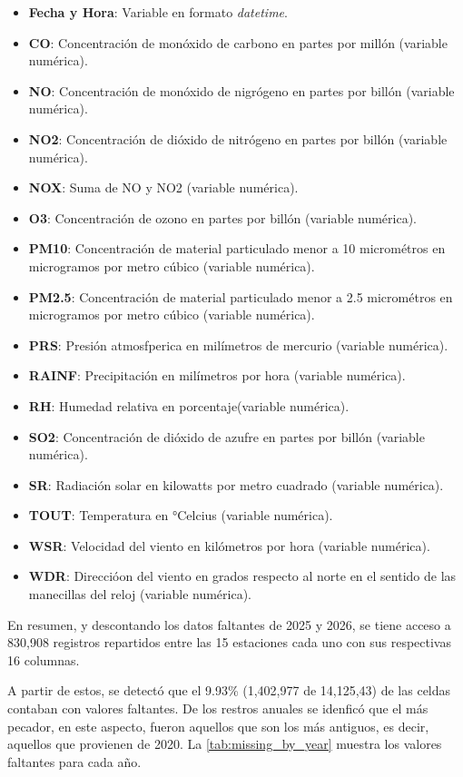 \documentclass[11pt]{article}
\begin{document}
\begin{itemize}
    \item \textbf{Fecha y Hora}: Variable en formato \textit{datetime}.
    \item \textbf{CO}: Concentración de monóxido de carbono en partes por millón (variable numérica).
    \item \textbf{NO}: Concentración de monóxido de nigrógeno en partes por billón (variable numérica).
    \item \textbf{NO2}: Concentración de dióxido de nitrógeno en partes por billón (variable numérica).
    \item \textbf{NOX}: Suma de NO y NO2 (variable numérica).
    \item \textbf{O3}: Concentración de ozono en partes por billón (variable numérica).
    \item \textbf{PM10}: Concentración de material particulado menor a 10 micrométros en microgramos por metro cúbico (variable numérica).
    \item \textbf{PM2.5}: Concentración de material particulado menor a 2.5 micrométros en microgramos por metro cúbico (variable numérica).
    \item \textbf{PRS}: Presión atmosfperica en milímetros de mercurio (variable numérica).
    \item \textbf{RAINF}: Precipitación en milímetros por hora (variable numérica).
    \item \textbf{RH}: Humedad relativa en porcentaje(variable numérica).
    \item \textbf{SO2}: Concentración de dióxido de azufre en partes por billón (variable numérica).
    \item \textbf{SR}: Radiación solar en kilowatts por metro cuadrado (variable numérica).
    \item \textbf{TOUT}: Temperatura en °Celcius (variable numérica).
    \item \textbf{WSR}: Velocidad del viento en kilómetros por hora (variable numérica).
    \item \textbf{WDR}: Direccióon del viento en grados respecto al norte en el sentido de las manecillas del reloj (variable numérica).
\end{itemize}

En resumen, y descontando los datos faltantes de 2025 y 2026, se tiene acceso a 830,908 registros repartidos entre las 15 estaciones cada uno con sus respectivas 16 columnas.

A partir de estos, se detectó que el 9.93\% (1,402,977 de 14,125,43) de las celdas contaban con valores faltantes. De los restros anuales se idenficó que el más pecador, en este aspecto, fueron aquellos que son los más antiguos, es decir, aquellos que provienen de 2020. La \ref{tab:missing_by_year} muestra los valores faltantes para cada año.
\end{document}
